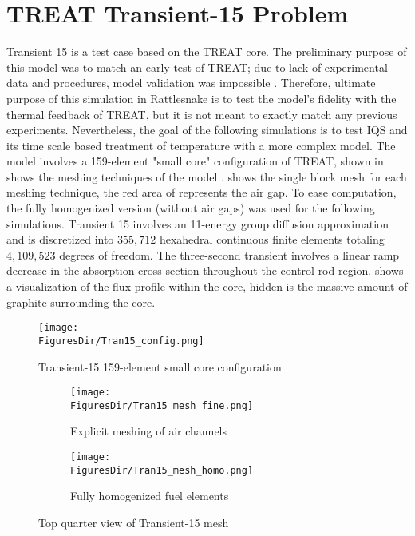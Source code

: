 \section{TREAT Transient-15 Problem}

Transient 15 is a test case based on the TREAT core. The preliminary purpose of this model was to match an early test of TREAT; due to lack of experimental data and procedures, model validation was impossible \cite{mammoth}. Therefore, ultimate purpose of this simulation in Rattlesnake is to test the model's fidelity with the thermal feedback of TREAT, but it is not meant to exactly match any previous experiments.  Nevertheless, the goal of the following simulations is to test IQS and its time scale based treatment of temperature with a more complex model. The model involves a 159-element "small core" configuration of TREAT, shown in  \cite{Tran15}.  shows the meshing techniques of the model \cite{mammoth}.  shows the single block mesh for each meshing technique, the red area of  represents the air gap. To ease computation, the fully homogenized version (without air gaps) was used  for the following simulations. Transient 15 involves an 11-energy group diffusion approximation and is discretized into $355,712$ hexahedral continuous finite elements totaling $4,109,523$ degrees of freedom.  The three-second transient involves a linear ramp decrease in the absorption cross section throughout the control rod region.  shows a visualization of the flux profile within the core, hidden is the massive amount of graphite surrounding the core.   

\begin{figure}[htbp!]
\centering
\texttt{[image: \\FiguresDir/Tran15\_config.png]}
\caption{Transient-15 159-element small core configuration}
\label{fig:Tran15_config}
\end{figure}

\begin{figure}[!htbp]
\centering
\begin{subfigure}[!htbp]{0.49\textwidth}
\texttt{[image: \\FiguresDir/Tran15\_mesh\_fine.png]}
\caption{Explicit meshing of air channels}
\label{fig:Tran15_mesh_fine}
\end{subfigure}
\begin{subfigure}[!htbp]{0.49\textwidth}
\texttt{[image: \\FiguresDir/Tran15\_mesh\_homo.png]}
\caption{Fully homogenized fuel elements}
\label{fig:Tran15_mesh_homo}
\end{subfigure}
\caption{Top quarter view of Transient-15 mesh}
\label{fig:Tran15_mesh}
\end{figure}

